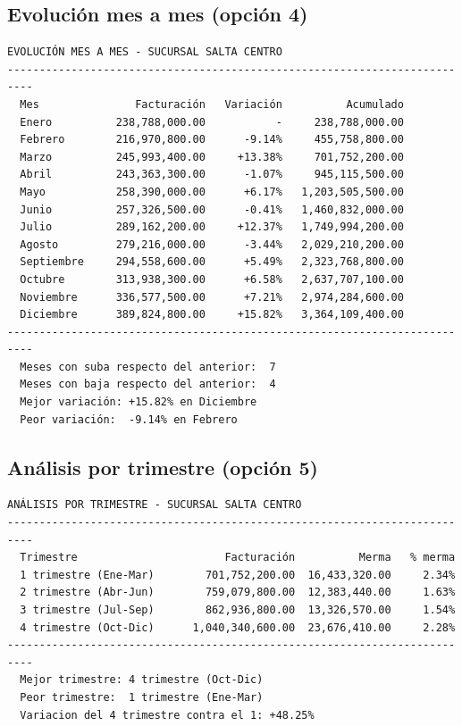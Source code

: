 \documentclass[12pt]{article}
\begin{document}
\newpage

\subsection{Evolución mes a mes (opción 4)}

\begin{lstlisting}[style=salida]
EVOLUCIÓN MES A MES - SUCURSAL SALTA CENTRO
--------------------------------------------------------------------------
  Mes               Facturación   Variación          Acumulado
  Enero          238,788,000.00           -     238,788,000.00
  Febrero        216,970,800.00      -9.14%     455,758,800.00
  Marzo          245,993,400.00     +13.38%     701,752,200.00
  Abril          243,363,300.00      -1.07%     945,115,500.00
  Mayo           258,390,000.00      +6.17%   1,203,505,500.00
  Junio          257,326,500.00      -0.41%   1,460,832,000.00
  Julio          289,162,200.00     +12.37%   1,749,994,200.00
  Agosto         279,216,000.00      -3.44%   2,029,210,200.00
  Septiembre     294,558,600.00      +5.49%   2,323,768,800.00
  Octubre        313,938,300.00      +6.58%   2,637,707,100.00
  Noviembre      336,577,500.00      +7.21%   2,974,284,600.00
  Diciembre      389,824,800.00     +15.82%   3,364,109,400.00
--------------------------------------------------------------------------
  Meses con suba respecto del anterior:  7
  Meses con baja respecto del anterior:  4
  Mejor variación: +15.82% en Diciembre
  Peor variación:  -9.14% en Febrero
\end{lstlisting}

\subsection{Análisis por trimestre (opción 5)}

\begin{lstlisting}[style=salida]
ANÁLISIS POR TRIMESTRE - SUCURSAL SALTA CENTRO
--------------------------------------------------------------------------
  Trimestre                       Facturación          Merma   % merma
  1 trimestre (Ene-Mar)        701,752,200.00  16,433,320.00     2.34%
  2 trimestre (Abr-Jun)        759,079,800.00  12,383,440.00     1.63%
  3 trimestre (Jul-Sep)        862,936,800.00  13,326,570.00     1.54%
  4 trimestre (Oct-Dic)      1,040,340,600.00  23,676,410.00     2.28%
--------------------------------------------------------------------------
  Mejor trimestre: 4 trimestre (Oct-Dic)
  Peor trimestre:  1 trimestre (Ene-Mar)
  Variacion del 4 trimestre contra el 1: +48.25%
\end{lstlisting}
\end{document}
